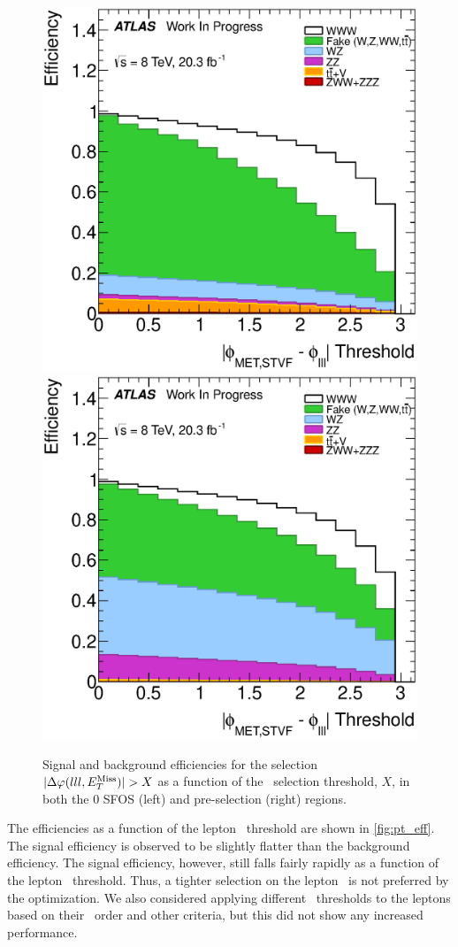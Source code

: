 \begin{figure}[ht!]
\centering
\includegraphics[width=0.45\columnwidth]{figures/optimization/SignalRegionsPreselection_0SFOS_Efficiencies/DeltaPhiMETSTVF123_Abs_Cumulative.eps}
\includegraphics[width=0.45\columnwidth]{figures/optimization/SignalRegions_0p5mmZ0_Preselection_Efficiencies/DeltaPhiMETSTVF123_Abs_Cumulative.eps}
\caption{ Signal and background efficiencies 
for the selection
$|\Delta\varphi(lll,E_{T}^{\textrm{Miss}})| > X$
as a function of the \deltaphi~selection
threshold, $X$, in both the 0 SFOS (left) and pre-selection (right) regions.  }
\label{fig:deltaphi_eff}
\end{figure}

The efficiencies as a function of the lepton \pt~threshold are shown 
in \fig\ref{fig:pt_eff}. 
The signal efficiency is observed to be slightly flatter
than the background efficiency.
The signal efficiency, however,  still falls fairly 
rapidly as a function of the lepton \pt~threshold. 
Thus, a tighter selection on the lepton \pt~is not preferred
by the optimization. We also considered 
applying different \pt~thresholds to the leptons
based on their \pt~order and other criteria, but
this did not show any increased performance.


